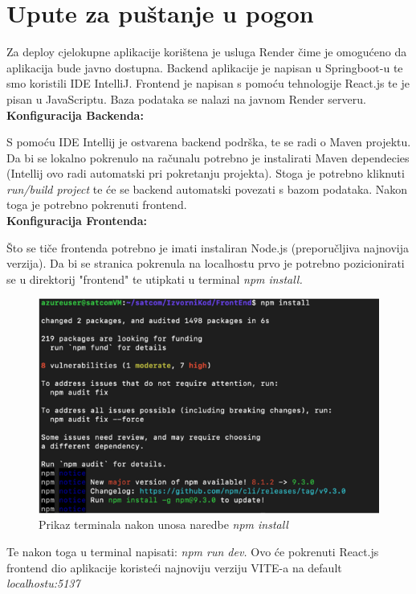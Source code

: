 			
			\eject 
		
		\section{Upute za puštanje u pogon}
		
			
            Za deploy cjelokupne aplikacije 	korištena je usluga Render čime je omogućeno da aplikacija bude javno dostupna. Backend aplikacije je napisan u Springboot-u te smo koristili IDE IntelliJ.  Frontend je napisan s pomoću tehnologije React.js te je pisan u JavaScriptu. Baza podataka se nalazi na javnom Render serveru. \\

            \textbf{Konfiguracija Backenda:}
            
            S pomoću IDE Intellij je ostvarena backend podrška, te se radi o Maven projektu.
            Da bi se lokalno pokrenulo na računalu potrebno je instalirati Maven dependecies (Intellij ovo radi automatski pri pokretanju projekta).
            Stoga je potrebno kliknuti \textit{run/build project} te će se backend automatski povezati s bazom podataka.
            Nakon toga je potrebno pokrenuti frontend. \\

            \textbf{Konfiguracija Frontenda:}
            
            Što se tiče frontenda potrebno je imati instaliran Node.js (preporučljiva najnovija verzija). 
            Da bi se stranica pokrenula na localhostu prvo je potrebno pozicionirati se u direktorij "frontend" te utipkati u terminal  
                \textit{npm install.}
         
			
			
			\begin{figure}[H]
				\includegraphics[width=\textwidth]{slike/npm install.PNG} %
				\centering
				\caption{Prikaz terminala nakon unosa naredbe \textit{npm install} }
				\label{fig:npminstall1}
			\end{figure}
			
			
 	
            Te nakon toga u terminal napisati: 
            \textit{npm run dev.}
            Ovo će pokrenuti React.js frontend dio aplikacije koristeći najnoviju verziju VITE-a na default \textit{localhostu:5137}
